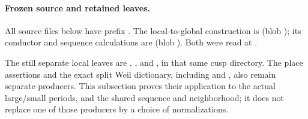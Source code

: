 \paragraph{Frozen source and retained leaves.}
All source files below have prefix
.
The local-to-global construction is
(blob );
its conductor and sequence calculations are
(blob ).
Both were read at .

The still separate local leaves are
,
, and
, in that same cusp directory.
The place assertions and the exact split Weil dictionary, including
 and ,
also remain separate producers.
This subsection proves their application to the actual large/small
periods, and the shared sequence and neighborhood; it does not replace
one of those producers by a choice of normalizations.
